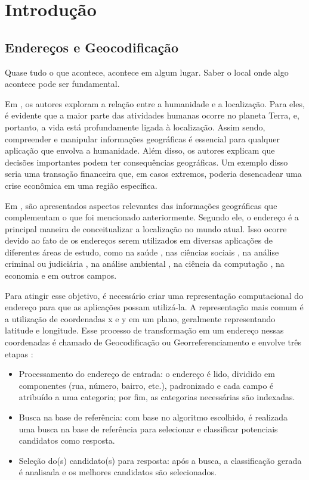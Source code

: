 \chapter{Introdução} \label{Introducao}

\section{Endereços e Geocodificação}
 
\epigraph{Quase tudo o que acontece, acontece em algum lugar. Saber o local onde algo acontece pode ser fundamental.}{\cite{longley2013}}

Em \cite{longley2013}, os autores exploram a relação entre a humanidade e a localização. Para eles, é evidente que a maior parte das atividades humanas ocorre no planeta Terra, e, portanto, a vida está profundamente ligada à localização. Assim sendo, compreender e manipular informações geográficas é essencial para qualquer aplicação que envolva a humanidade. Além disso, os autores explicam que decisões importantes podem ter consequências geográficas. Um exemplo disso seria uma transação financeira que, em casos extremos, poderia desencadear uma crise econômica em uma região específica.

Em \cite{Zamberg2009}, são apresentados aspectos relevantes das informações geográficas que complementam o que foi mencionado anteriormente. Segundo ele, o endereço é a principal maneira de conceitualizar a localização no mundo atual. Isso ocorre devido ao fato de os endereços serem utilizados em diversas aplicações de diferentes áreas de estudo, como na saúde \cite{AmericaJournal2001, Kypri2009, Mazumdar2008}, nas ciências sociais \cite{Chow2011}, na análise criminal ou judiciária \cite{Olligschlaeger1998}, na análise ambiental \cite{Gilboa2006}, na ciência da computação \cite{Zamberg2009}, na economia \cite{Whitsel2006} e em outros campos.

Para atingir esse objetivo, é necessário criar uma representação computacional do endereço para que as aplicações possam utilizá-la. A representação mais comum é a utilização de coordenadas x e y em um plano, geralmente representando latitude e longitude. Esse processo de transformação em um endereço nessas coordenadas é chamado de Geocodificação ou Georreferenciamento e envolve três etapas \cite{Zamberg2009}:

\begin{itemize}
   \item Processamento do endereço de entrada: o endereço é lido, dividido em componentes (rua, número, bairro, etc.), padronizado e cada campo é atribuído a uma categoria; por fim, as categorias necessárias são indexadas.
   \item Busca na base de referência: com base no algoritmo escolhido, é realizada uma busca na base de referência para selecionar e classificar potenciais candidatos como resposta.
   \item Seleção do(s) candidato(s) para resposta: após a busca, a classificação gerada é analisada e os melhores candidatos são selecionados.
\end{itemize}

